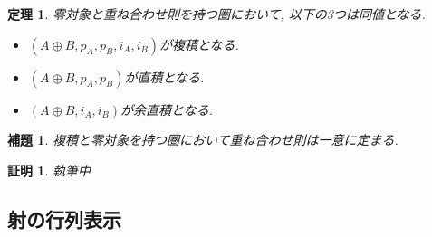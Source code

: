 \documentclass[a4paper,12pt]{ltjsarticle}
\theoremstyle{break}
\newtheorem{thrm}[thm]{定理}
\newtheorem{lem}[thm]{補題}
\newtheorem*{prf}{証明}
\newcommand{\opl}{\oplus}
\numberwithin{equation}{section}
\begin{document}
\begin{thrm}
  零対象と重ね合わせ則を持つ圏において, 以下の3つは同値となる. 
  \begin{itemize}
    \item $(A \opl B, p_A,p_B,i_A,i_B)$が複積となる. 
    \item $(A \opl B, p_A, p_B)$が直積となる. 
    \item $(A \opl B, i_A, i_B)$が余直積となる. 
  \end{itemize}
\end{thrm}

\begin{lem}
  複積と零対象を持つ圏において重ね合わせ則は一意に定まる. 
\end{lem}

\begin{prf}
  執筆中
\end{prf}

\subsection{射の行列表示}
\end{document}
